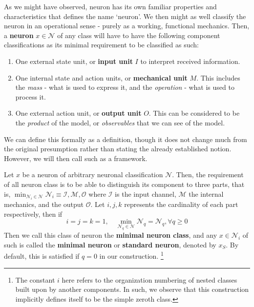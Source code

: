 As we might have observed, neuron has its own familiar properties and characteristics that defines the name `neuron'. We then might as well classify the neuron in an operational sense - purely as a working, functional mechanics. Then, a \textbf{neuron} $x\in \mathcal{N}$ of any class will have to have the following component classifications as its minimal requirement to be classified as such: 
\begin{enumerate}[topsep=1pt,itemsep=0.5pt,leftmargin=18pt]
    \item One external state unit, or \textbf{input unit} $I$ to interpret received information. 
    \item One internal state and action units, or \textbf{mechanical unit} $M$. This includes the \textit{mass} - what is used to express it, and the \textit{operation} - what is used to process it. 
    \item One external action unit, or \textbf{output unit} $O$. This can be considered to be the \textit{product} of the model, or \textit{observables} that we can see of the model. 
\end{enumerate}
We can define this formally as a definition, though it does not change much from the original presumption rather than stating the already established notion. However, we will then call such as a framework. 
\begin{definition}
    Let $x$ be a neuron of arbitrary neuronal classification $\mathcal{N}$. Then, the requirement of all neuron class is to be able to distinguish its component to three parts, that is, $\min_{\mathcal{N}_{i}\in \mathcal{N}}{\mathcal{N}_{i}}\equiv \mathcal{I}, \mathcal{M},\mathcal{O}$ where $\mathcal{I}$ is the input channel, $\mathcal{M}$ the internal mechanics, and the output $\mathcal{O}$. Let $i,j,k$ represents the cardinality of each part respectively, then if
    \begin{equation}
        i=j=k=1, \quad \min_{\mathcal{N}_{q}\in \mathcal{N}}{\mathcal{N}_{q}} = \mathcal{N}_{q}, \forall q \geq 0
    \end{equation}
    Then we call this class of neuron the \textbf{minimal neuron class}, and any $x\in \mathcal{N}_{i}$ of such is called the \textbf{minimal neuron} or \textbf{standard neuron}, denoted by $x_{S}$. By default, this is satisfied if $q=0$ in our construction. \footnote{The constant $i$ here refers to the organization numbering of nested classes built upon by another components. In such, we observe that this construction implicitly defines itself to be the simple zeroth class.}
\end{definition}
